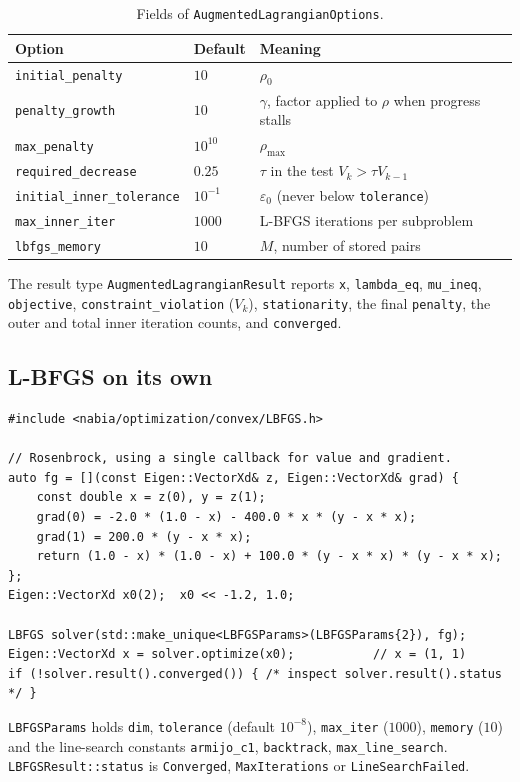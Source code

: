 \documentclass[11pt,a4paper]{article}
\begin{document}
\begin{table}[ht]
\centering
\begin{tabular}{@{}llp{6.5cm}@{}}
\toprule
Option & Default & Meaning \\
\midrule
\texttt{initial\_penalty} & $10$ & $\rho_0$ \\
\texttt{penalty\_growth} & $10$ & $\gamma$, factor applied to $\rho$ when progress stalls \\
\texttt{max\_penalty} & $10^{10}$ & $\rho_{\max}$ \\
\texttt{required\_decrease} & $0.25$ & $\tau$ in the test $V_k>\tau V_{k-1}$ \\
\texttt{initial\_inner\_tolerance} & $10^{-1}$ & $\varepsilon_0$ (never below \texttt{tolerance}) \\
\texttt{max\_inner\_iter} & $1000$ & L-BFGS iterations per subproblem \\
\texttt{lbfgs\_memory} & $10$ & $M$, number of stored pairs \\
\bottomrule
\end{tabular}
\caption{Fields of \texttt{AugmentedLagrangianOptions}.}
\end{table}

The result type \texttt{AugmentedLagrangianResult} reports \texttt{x},
\texttt{lambda\_eq}, \texttt{mu\_ineq}, \texttt{objective},
\texttt{constraint\_violation} ($V_k$),
\texttt{stationarity}, the final \texttt{penalty}, the outer and total inner
iteration counts, and \texttt{converged}.

\subsection{L-BFGS on its own}
\begin{lstlisting}
#include <nabia/optimization/convex/LBFGS.h>

// Rosenbrock, using a single callback for value and gradient.
auto fg = [](const Eigen::VectorXd& z, Eigen::VectorXd& grad) {
    const double x = z(0), y = z(1);
    grad(0) = -2.0 * (1.0 - x) - 400.0 * x * (y - x * x);
    grad(1) = 200.0 * (y - x * x);
    return (1.0 - x) * (1.0 - x) + 100.0 * (y - x * x) * (y - x * x);
};
Eigen::VectorXd x0(2);  x0 << -1.2, 1.0;

LBFGS solver(std::make_unique<LBFGSParams>(LBFGSParams{2}), fg);
Eigen::VectorXd x = solver.optimize(x0);           // x = (1, 1)
if (!solver.result().converged()) { /* inspect solver.result().status */ }
\end{lstlisting}
\texttt{LBFGSParams} holds \texttt{dim}, \texttt{tolerance} (default
$10^{-8}$), \texttt{max\_iter} ($1000$), \texttt{memory} ($10$) and the line-search
constants \texttt{armijo\_c1}, \texttt{backtrack}, \texttt{max\_line\_search}.
\texttt{LBFGSResult::status} is \texttt{Converged}, \texttt{MaxIterations} or
\texttt{LineSearchFailed}.
\end{document}
